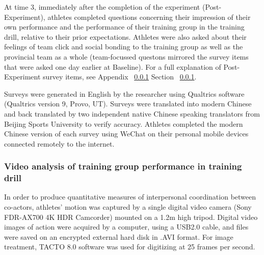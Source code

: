 \documentclass[english]{article}\usepackage[]{graphicx}\usepackage[]{color}
\begin{document}
At time 3, immediately after the completion of the experiment (Post-Experiment), athletes completed questions concerning their impression of their own performance and the performance of their training group in the training drill, relative to their prior expectations.  Athletes were also asked about their feelings of team click and social bonding to the training group as well as the provincial team as a whole (team-focussed questons mirrored the survey items that were asked one day earlier at Baseline).  For a full explanation of Post-Experiment survey items, see Appendix ~\ref{} Section ~\ref{}.

Surveys were generated in English by the researcher using Qualtrics software (Qualtrics version 9, Provo, UT). Surveys were translated into modern Chinese and back translated by two independent native Chinese speaking translators from Beijing Sports University to verify accuracy.  Athletes completed the modern Chinese version of each survey using WeChat on their personal mobile devices connected remotely to the internet.





\subsubsection{Video analysis of training group performance in training drill}
In order to produce quantitative measures of interpersonal coordination between co-actors, athletes’ motion was captured by a single digital video camera (Sony FDR-AX700 4K HDR Camcorder) mounted on a 1.2m high tripod. Digital video images of action were acquired by a computer, using a USB2.0 cable, and files were saved on an encrypted external hard disk in .AVI format. For image treatment, TACTO 8.0 software was used for digitizing at 25 frames per second.
\end{document}
